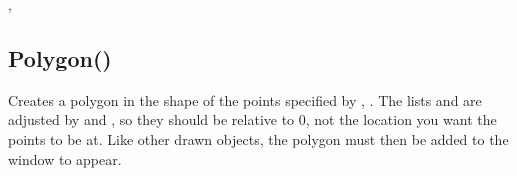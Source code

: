 \documentclass[letterpaper,10pt,english]{sphinxmanual}
\begin{document}
\sphinxAtStartPar
{}

\sphinxAtStartPar
{}, 

\ignorespaces 

\subsection{Polygon()}
\label{\detokenize{reference/peblobjects:polygon}}\label{\detokenize{reference/peblobjects:index-35}}
\sphinxAtStartPar
{}

\sphinxAtStartPar
Creates a polygon in the shape of the points specified by , . The lists  and  are adjusted by   and , so they should be relative to 0, not the location you want the points to be at.  Like other drawn objects, the polygon must then be added to the window to appear.

\sphinxAtStartPar
{}

\begin{sphinxVerbatim}[commandchars=\\\{\}]
\end{sphinxVerbatim}

\sphinxAtStartPar
{}
\end{document}
